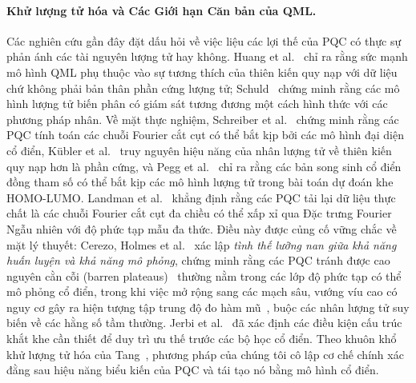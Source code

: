 \documentclass[10pt,twocolumn,letterpaper]{article}
\begin{document}
\paragraph{Khử lượng tử hóa và Các Giới hạn Căn bản của QML.}
Các nghiên cứu gần đây đặt dấu hỏi về việc liệu các lợi thế của PQC có thực sự phản ánh các tài nguyên lượng tử hay không. Huang et al.~\cite{Huang:2021qml} chỉ ra rằng sức mạnh mô hình QML phụ thuộc vào sự tương thích của thiên kiến quy nạp với dữ liệu chứ không phải bản thân phần cứng lượng tử; Schuld~\cite{Schuld:2021kernel} chứng minh rằng các mô hình lượng tử biến phân có giám sát tương đương một cách hình thức với các phương pháp nhân. Về mặt thực nghiệm, Schreiber et al.~\cite{Schreiber:2022roq} chứng minh rằng các PQC tính toán các chuỗi Fourier cắt cụt có thể bắt kịp bởi các mô hình đại diện cổ điển, K\"ubler et al.~\cite{kubler2021inductive} truy nguyên hiệu năng của nhân lượng tử về thiên kiến quy nạp hơn là phần cứng, và Pegg et al.~\cite{pegg2026isoqgnn} chỉ ra rằng các bản song sinh cổ điển đồng tham số có thể bắt kịp các mô hình lượng tử trong bài toán dự đoán khe HOMO-LUMO. Landman et al.~\cite{landman2023approximating} khẳng định rằng các PQC tải lại dữ liệu thực chất là các chuỗi Fourier cắt cụt đa chiều có thể xấp xỉ qua Đặc trưng Fourier Ngẫu nhiên với độ phức tạp mẫu đa thức. Điều này được củng cố vững chắc về mặt lý thuyết: Cerezo, Holmes et al.~\cite{Cerezo:2023nqf} xác lập \textit{tình thế lưỡng nan giữa khả năng huấn luyện và khả năng mô phỏng}, chứng minh rằng các PQC tránh được cao nguyên cằn cỗi (barren plateaus)~\cite{Cerezo:2020mtn, McClean:2018jps} thường nằm trong các lớp độ phức tạp có thể mô phỏng cổ điển, trong khi việc mở rộng sang các mạch sâu, vướng víu cao có nguy cơ gây ra hiện tượng tập trung độ đo hàm mũ~\cite{Thanasilp:2022agd}, buộc các nhân lượng tử suy biến về các hằng số tầm thường. Jerbi et al.~\cite{Jerbi:2021qnz} đã xác định các điều kiện cấu trúc khắt khe cần thiết để duy trì ưu thế trước các bộ học cổ điển. Theo khuôn khổ khử lượng tử hóa của Tang~\cite{Tang:2018lmw}, phương pháp của chúng tôi cô lập cơ chế chính xác đằng sau hiệu năng biểu kiến của PQC và tái tạo nó bằng mô hình cổ điển.
\end{document}
